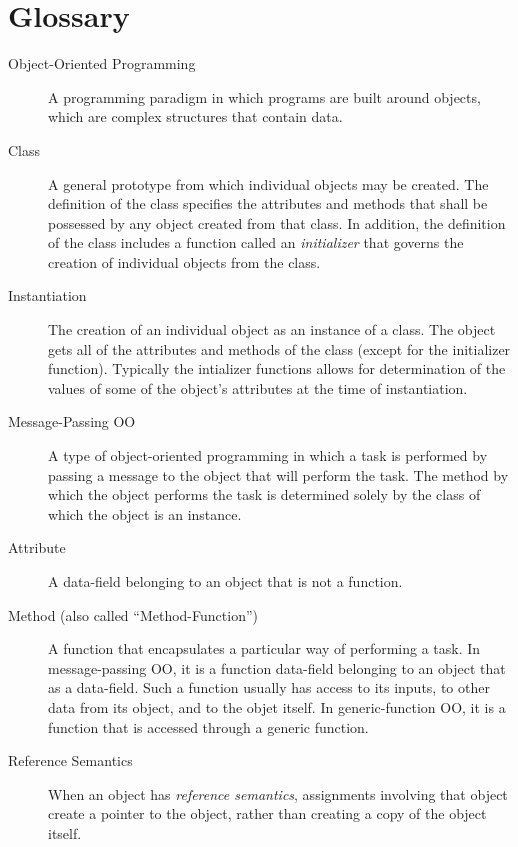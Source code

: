 \documentclass[]{book}
\theoremstyle{definition}
\theoremstyle{definition}
\theoremstyle{definition}
\theoremstyle{remark}
\begin{document}
{\newpage

\section*{Glossary}\label{glossary-11}

\begin{description}
\item[Object-Oriented Programming ]
A programming paradigm in which programs are built around objects, which
are complex structures that contain data.
\item[Class ]
A general prototype from which individual objects may be created. The
definition of the class specifies the attributes and methods that shall
be possessed by any object created from that class. In addition, the
definition of the class includes a function called an \emph{initializer}
that governs the creation of individual objects from the class.
\item[Instantiation ]
The creation of an individual object as an instance of a class. The
object gets all of the attributes and methods of the class (except for
the initializer function). Typically the intializer functions allows for
determination of the values of some of the object's attributes at the
time of instantiation.
\item[Message-Passing OO ]
A type of object-oriented programming in which a task is performed by
passing a message to the object that will perform the task. The method
by which the object performs the task is determined solely by the class
of which the object is an instance.
\item[Attribute ]
A data-field belonging to an object that is not a function.
\item[Method (also called ``Method-Function'') ]
A function that encapsulates a particular way of performing a task. In
message-passing OO, it is a function data-field belonging to an object
that as a data-field. Such a function usually has access to its inputs,
to other data from its object, and to the objet itself. In
generic-function OO, it is a function that is accessed through a generic
function.
\item[Reference Semantics ]
When an object has \emph{reference semantics}, assignments involving
that object create a pointer to the object, rather than creating a copy
of the object itself.

\end{description}}
\end{document}
